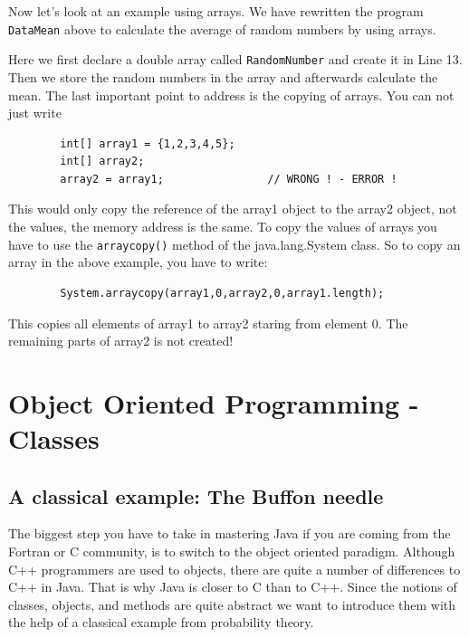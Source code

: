 Now let's look at an example using arrays. We have rewritten the program
\verb|DataMean| above to calculate the average of random 
numbers by using arrays.


Here we first declare a double array called \verb|RandomNumber| and
create it in Line 13. Then we store the random numbers in the array
and afterwards calculate the mean.
The last important point to address is the copying of arrays. 
You can not just write
\begin{verbatim}
        int[] array1 = {1,2,3,4,5};
        int[] array2;
        array2 = array1;                // WRONG ! - ERROR ! 
\end{verbatim}
This would only copy the reference of the array1 object to the array2
object, not the values, the memory address is the same. 
To copy the values of arrays you have to use the 
\verb|arraycopy()| method of the java.lang.System class. 
So to copy an array in the above example, you have to write:
\begin{verbatim}
        System.arraycopy(array1,0,array2,0,array1.length);
\end{verbatim}
This copies all elements of array1 to array2 staring from element 0. 
The remaining parts 
of array2 is not created!


\section{Object Oriented Programming - Classes}
\label{sec:objectoriented}
\subsection{A classical example: The Buffon needle}
The biggest step you have to take in mastering Java if you are
coming from the Fortran or C community, is to switch to the object
oriented paradigm. Although C++ programmers are used to objects, there
are quite a number of differences to C++ in Java. That is why Java
is closer to C than to C++. Since the notions of classes, objects, and
methods are quite abstract we want to introduce them with the help of
a classical example from probability theory. 

